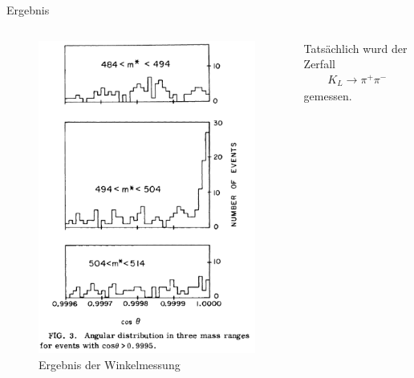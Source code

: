 \documentclass[aspectratio=1610, professionalfonts, 9pt, t]{beamer}
\begin{document}
  \begin{frame}{Ergebnis}
    \begin{columns}[onlytextwidth]
      \begin{column}{0.4\textwidth}
        \begin{figure}[ht]
          \begin{center}
            \includegraphics[height=0.8\textheight]{Images/croninfitch_erg.png}
            \caption{Ergebnis der Winkelmessung}
          \end{center}
        \end{figure}
      \end{column}
      \begin{column}{0.5\textwidth}
        \newline
        \newline
        \newline
        \newline
        Tatsächlich wurd der Zerfall
        \begin{align*}
          K_{L} \rightarrow \pi^{+} \pi^{-}
        \end{align*}
        gemessen.
      \end{column}
    \end{columns}
  \end{frame}
\end{document}
